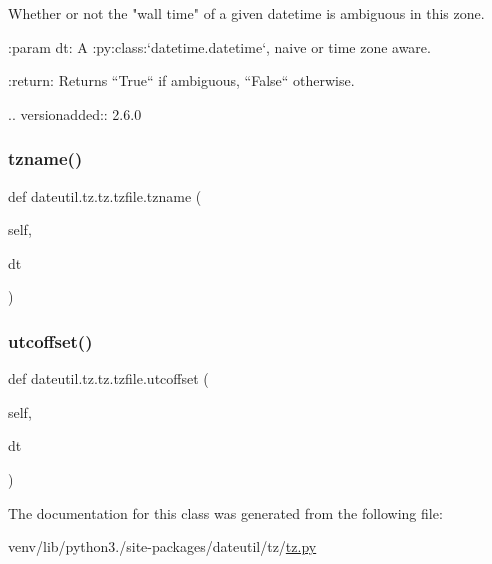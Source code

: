 \begin{DoxyVerb}Whether or not the "wall time" of a given datetime is ambiguous in this
zone.

:param dt:
    A :py:class:`datetime.datetime`, naive or time zone aware.


:return:
    Returns ``True`` if ambiguous, ``False`` otherwise.

.. versionadded:: 2.6.0
\end{DoxyVerb}
 \mbox{\label{classdateutil_1_1tz_1_1tz_1_1tzfile_adcc1cb91aeb3064b12d54ee4a57ac38f}} 
\subsubsection{\texorpdfstring{tzname()}{tzname()}}
{\footnotesize\ttfamily def dateutil.\+tz.\+tz.\+tzfile.\+tzname (\begin{DoxyParamCaption}\item[{}]{self,  }\item[{}]{dt }\end{DoxyParamCaption})}

\mbox{\label{classdateutil_1_1tz_1_1tz_1_1tzfile_a958135319a0ba1cca1949b48c65f4c93}} 
\subsubsection{\texorpdfstring{utcoffset()}{utcoffset()}}
{\footnotesize\ttfamily def dateutil.\+tz.\+tz.\+tzfile.\+utcoffset (\begin{DoxyParamCaption}\item[{}]{self,  }\item[{}]{dt }\end{DoxyParamCaption})}



The documentation for this class was generated from the following file\+:\begin{DoxyCompactItemize}
\item 
venv/lib/python3./site-\/packages/dateutil/tz/\hyperlink{tz_8py}{tz.\+py}\end{DoxyCompactItemize}
